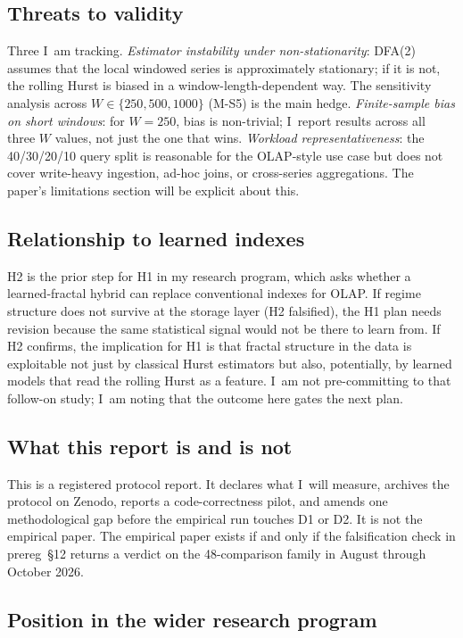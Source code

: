 \documentclass[11pt]{article}
\begin{document}
\subsection{Threats to validity}

Three I~am tracking. \emph{Estimator instability under non-stationarity}: DFA(2) assumes that the local windowed series is approximately stationary; if it is not, the rolling Hurst is biased in a window-length-dependent way. The sensitivity analysis across $W\in\{250,500,1000\}$ (M-S5) is the main hedge. \emph{Finite-sample bias on short windows}: for $W=250$, bias is non-trivial; I~report results across all three $W$ values, not just the one that wins. \emph{Workload representativeness}: the 40/30/20/10 query split is reasonable for the OLAP-style use case but does not cover write-heavy ingestion, ad-hoc joins, or cross-series aggregations. The paper's limitations section will be explicit about this.

\subsection{Relationship to learned indexes}

H2 is the prior step for H1 in my research program, which asks whether a learned-fractal hybrid can replace conventional indexes for OLAP. If regime structure does not survive at the storage layer (H2 falsified), the H1 plan needs revision because the same statistical signal would not be there to learn from. If H2 confirms, the implication for H1 is that fractal structure in the data is exploitable not just by classical Hurst estimators but also, potentially, by learned models that read the rolling Hurst as a feature. I~am not pre-committing to that follow-on study; I~am noting that the outcome here gates the next plan.

\subsection{What this report is and is not}

This is a registered protocol report. It declares what I~will measure, archives the protocol on Zenodo, reports a code-correctness pilot, and amends one methodological gap before the empirical run touches D1 or D2. It is not the empirical paper. The empirical paper exists if and only if the falsification check in prereg~\S12 returns a verdict on the 48-comparison family in August through October 2026.

\subsection{Position in the wider research program}
\label{sec:program}
\end{document}
